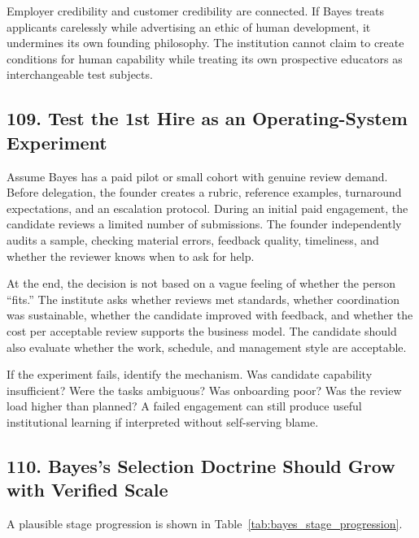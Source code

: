 Employer credibility and customer credibility are connected. If Bayes treats applicants carelessly while advertising an ethic of human development, it undermines its own founding philosophy. The institution cannot claim to create conditions for human capability while treating its own prospective educators as interchangeable test subjects.

\subsection*{109. Test the 1st Hire as an Operating-System Experiment}

Assume Bayes has a paid pilot or small cohort with genuine review demand. Before delegation, the founder creates a rubric, reference examples, turnaround expectations, and an escalation protocol. During an initial paid engagement, the candidate reviews a limited number of submissions. The founder independently audits a sample, checking material errors, feedback quality, timeliness, and whether the reviewer knows when to ask for help.

At the end, the decision is not based on a vague feeling of whether the person ``fits.'' The institute asks whether reviews met standards, whether coordination was sustainable, whether the candidate improved with feedback, and whether the cost per acceptable review supports the business model. The candidate should also evaluate whether the work, schedule, and management style are acceptable.

If the experiment fails, identify the mechanism. Was candidate capability insufficient? Were the tasks ambiguous? Was onboarding poor? Was the review load higher than planned? A failed engagement can still produce useful institutional learning if interpreted without self-serving blame.

\subsection*{110. Bayes's Selection Doctrine Should Grow with Verified Scale}

A plausible stage progression is shown in Table~\ref{tab:bayes_stage_progression}.

